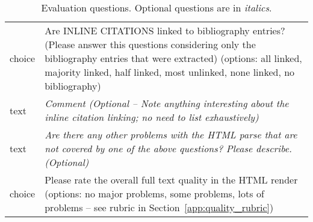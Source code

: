 \begin{table}[h!]
\begin{tabular}{lp{130mm}}
    \midrule
    choice & Are INLINE CITATIONS linked to bibliography entries? (Please answer this questions considering only the bibliography entries that were extracted) (options: all linked, majority linked, half linked, most unlinked, none linked, no bibliography) \\
    text & \textit{Comment (Optional -- Note anything interesting about the inline citation linking; no need to list exhaustively)} \\
    \midrule 
    text & \textit{Are there any other problems with the HTML parse that are not covered by one of the above questions? Please describe. (Optional)} \\
    \midrule
    choice & Please rate the overall full text quality in the HTML render (options: no major problems, some problems, lots of problems -- see rubric in Section~\ref{app:quality_rubric}) \\
    \bottomrule
\end{tabular}
\caption{Evaluation questions. Optional questions are in \textit{italics}.}
\label{tab:eval_questions}

\end{table}
